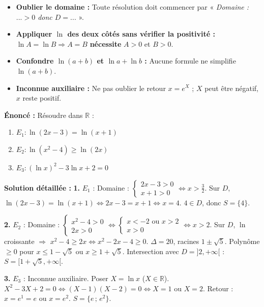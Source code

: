 \documentclass[11pt]{article}
\begin{document}
\begin{attention}
\begin{itemize}
  \item \textbf{Oublier le domaine :} Toute résolution doit commencer par « \emph{Domaine : $...>0$ donc $D=...$} ».
  \item \textbf{Appliquer $\ln$ des deux côtés sans vérifier la positivité :} $\ln A = \ln B \Rightarrow A=B$ \textbf{nécessite} $A>0$ et $B>0$.
  \item \textbf{Confondre $\ln(a+b)$ et $\ln a + \ln b$ :} Aucune formule ne simplifie $\ln(a+b)$.
  \item \textbf{Inconnue auxiliaire :} Ne pas oublier le retour $x=e^X$ ; $X$ peut être négatif, $x$ reste positif.
\end{itemize}
\end{attention}

\begin{exoresolu}
\textbf{Énoncé :} Résoudre dans $\mathbb{R}$ :
\begin{enumerate}
  \item $E_1 : \ln(2x-3) = \ln(x+1)$
  \item $E_2 : \ln(x^2-4) \ge \ln(2x)$
  \item $E_3 : (\ln x)^2 - 3\ln x + 2 = 0$
\end{enumerate}
\textbf{Solution détaillée :}
\tcblower
\textbf{1.} $E_1$ : Domaine : $\begin{cases} 2x-3>0 \\ x+1>0 \end{cases} \Leftrightarrow x>\frac{3}{2}$.
Sur $D$, $\ln(2x-3)=\ln(x+1) \Leftrightarrow 2x-3 = x+1 \Leftrightarrow x=4$.
$4 \in D$, donc $S = \{4\}$.

\textbf{2.} $E_2$ : Domaine : $\begin{cases} x^2-4>0 \\ 2x>0 \end{cases} \Leftrightarrow \begin{cases} x<-2 \text{ ou } x>2 \\ x>0 \end{cases} \Leftrightarrow x>2$.
Sur $D$, $\ln$ croissante $\Rightarrow$ $x^2-4 \ge 2x \Leftrightarrow x^2-2x-4 \ge 0$.
$\Delta = 20$, racines $1\pm\sqrt{5}$. Polynôme $\ge 0$ pour $x \le 1-\sqrt{5}$ ou $x \ge 1+\sqrt{5}$.
Intersection avec $D = ]2,+\infty[$ : $S = [1+\sqrt{5}, +\infty[$.

\textbf{3.} $E_3$ : Inconnue auxiliaire. Poser $X = \ln x$ ($X\in\mathbb{R}$).
$X^2 - 3X + 2 = 0 \Leftrightarrow (X-1)(X-2)=0 \Leftrightarrow X=1$ ou $X=2$.
Retour : $x = e^1 = e$ ou $x = e^2$.
$S = \{e\,;\, e^2\}$.
\end{exoresolu}
\end{document}
